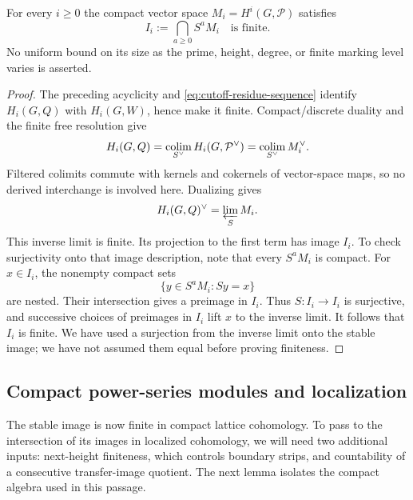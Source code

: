 \begin{theorem}
\label{thm:cutoff-stable}
For every $i\geq0$ the compact vector space
$M_i=H^i(G,\mathcal P)$ satisfies
\begin{equation}
 I_i:=\bigcap_{a\geq0}S^aM_i\quad\text{is finite}.
 \label{eq:cutoff-stable}
\end{equation}
No uniform bound on its size as the prime, height, degree, or finite
marking level varies is asserted.
\end{theorem}

\begin{proof}
The preceding acyclicity and
\cref{eq:cutoff-residue-sequence} identify $H_i(G,Q)$ with
$H_i(G,W)$, hence make it finite.  Compact/discrete duality and the
finite free resolution give
\[
 H_i(G,Q)
   =\operatorname*{colim}_{S^\vee}H_i(G,\mathcal P^\vee)
   =\operatorname*{colim}_{S^\vee}M_i^\vee.
\]
Filtered colimits commute with kernels and cokernels of vector-space
maps, so no derived interchange is involved here.  Dualizing gives
\[
 H_i(G,Q)^\vee=\varprojlim_S M_i.
\]
This inverse limit is finite.  Its projection to the first term has
image $I_i$.  To check surjectivity onto that image description, note
that every $S^aM_i$ is compact.  For $x\in I_i$, the nonempty compact
sets
\[
 \{y\in S^aM_i:Sy=x\}
\]
are nested.  Their intersection gives a preimage in $I_i$.
Thus $S:I_i\to I_i$ is surjective, and successive choices of
preimages in $I_i$ lift $x$ to the inverse limit.  It follows that
$I_i$ is finite.  We have used a surjection from the inverse limit
onto the stable image; we have not assumed them equal before proving
finiteness.
\end{proof}

\subsection{Compact power-series modules and localization}

The stable image is now finite in compact lattice cohomology. To pass
to the intersection of its images in localized cohomology, we will need
two additional inputs: next-height finiteness, which controls boundary
strips, and countability of a consecutive transfer-image quotient.
The next lemma isolates the compact algebra used in this passage.


